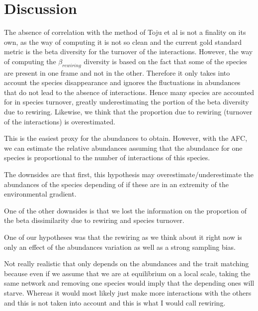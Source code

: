 \section{Discussion}

The absence of correlation with the method of Toju et al is not a finality on its own, as the way of computing it is not so clean and the current gold standard metric is the beta diversity for the turnover of the interactions. However, the way of computing the $\beta_{rewiring}$ diversity is based on the fact that some of the species are present in one frame and not in the other. Therefore it only takes into account the species disappearance and ignores the fluctuations in abundances that do not lead to the absence of interactions. Hence many species are accounted for in species turnover, greatly underestimating the portion of the beta diversity due to rewiring. Likewise, we think that the proportion due to rewiring (turnover of the interactions) is overestimated.

This is the easiest proxy for the abundances to obtain. However, with the AFC, we can estimate the relative abundances assuming that the abundance for one species is proportional to the number of interactions of this species.

The downsides are that first, this hypothesis may overestimate/underestimate the abundances of the species depending of if these are in an extremity of the environmental gradient.

One of the other downsides is that we lost the information on the proportion of the beta dissimilarity due to rewiring and species turnover. 

One of our hypotheses was that the rewiring as we think about it right now is only an effect of the abundances variation as well as a strong sampling bias.


Not really realistic that only depends on the abundances and the trait matching because even if we assume that we are at equilibrium on a local scale, taking the same network and removing one species would imply that the depending ones will starve. Whereas it would most likely just make more interactions with the others and this is not taken into account and this is what I would call rewiring.